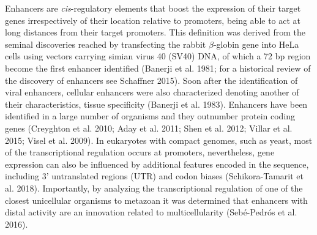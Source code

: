 Enhancers are \textit{cis}-regulatory elements that boost the expression of their target genes irrespectively of their location relative to promoters, being able to act at long distances from their target promoters. This definition was derived from the seminal discoveries reached by transfecting the rabbit $\beta$-globin gene into HeLa cells using vectors carrying simian virus 40 (SV40) DNA, of which a 72 bp region become the first enhancer identified (Banerji et al. 1981; for a historical review of the discovery of enhancers see Schaffner 2015). Soon after the identification of viral enhancers, cellular enhancers were also characterized denoting another of their characteristics, tissue specificity (Banerji et al. 1983). Enhancers have been identified in a large number of organisms and they outnumber protein coding genes (Creyghton et al. 2010; Aday et al. 2011; Shen et al. 2012; Villar et al. 2015; Visel et al. 2009). In eukaryotes with compact genomes, such as yeast, most of the transcriptional regulation occurs at promoters, nevertheless, gene expression can also be influenced by additional features encoded in the sequence, including 3’ untranslated regions (UTR) and codon biases (Schikora-Tamarit et al. 2018). Importantly, by analyzing the transcriptional regulation of one of the closest unicellular organisms to metazoan it was determined that enhancers with distal activity are an innovation related to multicellularity (Sebé-Pedrós et al. 2016).\\

